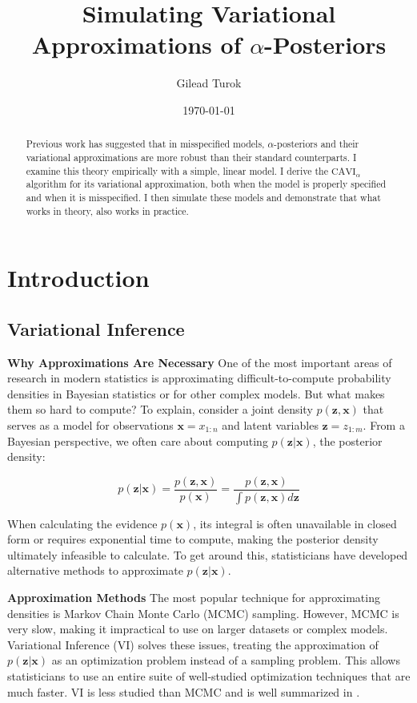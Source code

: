 \documentclass[letterpaper,12pt]{article}
\newcommand{\px}{\ensuremath{p(\boldsymbol{x})}}
\newcommand{\pzx}{\ensuremath{p(\boldsymbol{z}, \boldsymbol{x})}}
\newcommand{\pzgivenx}{\ensuremath{p(\boldsymbol{z} | \boldsymbol{x})}}
\newcommand{\x}{\mathbf{x}}
\newcommand{\z}{\mathbf{z}}
\newcommand{\cavi}{\ensuremath{\mathrm{CAVI}}}
\begin{document}
\title{Simulating Variational Approximations of $\alpha$-Posteriors}
\author{Gilead Turok}
\date{\today}
\maketitle

\begin{abstract}
    Previous work has suggested that in misspecified models, $\alpha$-posteriors and their variational approximations are more robust than their standard counterparts. I examine this theory empirically with a simple, linear model. I derive the $\cavi_\alpha$ algorithm for its variational approximation, both when the model is properly specified and when it is misspecified. I then simulate these models and demonstrate that what works in theory, also works in practice.
\end{abstract}


\section{Introduction}
\subsection{Variational Inference}

\textbf{Why Approximations Are Necessary} One of the most important areas of research in modern statistics is approximating difficult-to-compute probability densities in Bayesian statistics or for other complex models. But what makes them so hard to compute? To explain, consider a joint density $\pzx$ that serves as a model for observations $\x=x_{1:n}$ and latent variables $\z=z_{1:m}$. From a Bayesian perspective, we often care about computing $\pzgivenx$, the posterior density:

\begin{equation*}
    \pzgivenx = \frac{\pzx}{\px} = \frac{\pzx}{\int \pzx d\z}
\end{equation*}

When calculating the evidence \px, its integral is often unavailable in closed form or requires exponential time to compute, making the posterior density ultimately infeasible to calculate. To get around this, statisticians have developed alternative methods to approximate $\pzgivenx$. 

\textbf{Approximation Methods} The most popular technique for approximating densities is Markov Chain Monte Carlo (MCMC) sampling. However, MCMC is very slow, making it impractical to use on larger datasets or complex models. Variational Inference (VI) solves these issues, treating the approximation of $\pzgivenx$ as an optimization problem instead of a sampling problem. This allows statisticians to use an entire suite of well-studied optimization techniques that are much faster. VI is less studied than MCMC and is well summarized in \cite{blei}.
\end{document}
